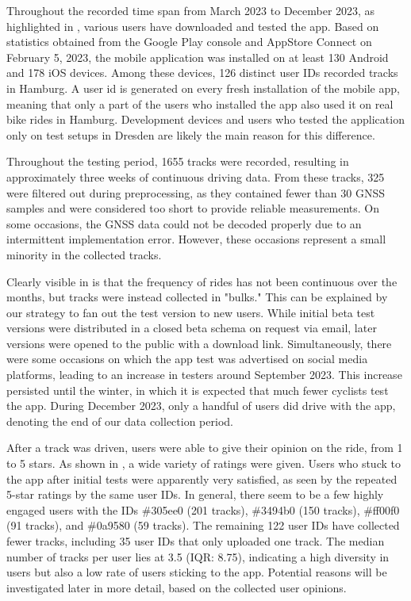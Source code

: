 Throughout the recorded time span from March 2023 to December 2023, as highlighted in , various users have downloaded and tested the app. Based on statistics obtained from the Google Play console and AppStore Connect on February 5, 2023, the mobile application was installed on at least 130 Android and 178 iOS devices. Among these devices, 126 distinct user IDs recorded tracks in Hamburg. A user id is generated on every fresh installation of the mobile app, meaning that only a part of the users who installed the app also used it on real bike rides in Hamburg. Development devices and users who tested the application only on test setups in Dresden are likely the main reason for this difference.

Throughout the testing period, 1655 tracks were recorded, resulting in approximately three weeks of continuous driving data. From these tracks, 325 were filtered out during preprocessing, as they contained fewer than 30 GNSS samples and were considered too short to provide reliable measurements. On some occasions, the GNSS data could not be decoded properly due to an intermittent implementation error. However, these occasions represent a small minority in the collected tracks.

Clearly visible in  is that the frequency of rides has not been continuous over the months, but tracks were instead collected in "bulks." This can be explained by our strategy to fan out the test version to new users. While initial beta test versions were distributed in a closed beta schema on request via email, later versions were opened to the public with a download link. Simultaneously, there were some occasions on which the app test was advertised on social media platforms, leading to an increase in testers around September 2023. This increase persisted until the winter, in which it is expected that much fewer cyclists test the app. During December 2023, only a handful of users did drive with the app, denoting the end of our data collection period. 

After a track was driven, users were able to give their opinion on the ride, from 1 to 5 stars. As shown in , a wide variety of ratings were given. Users who stuck to the app after initial tests were apparently very satisfied, as seen by the repeated 5-star ratings by the same user IDs. In general, there seem to be a few highly engaged users with the IDs \#305ee0 (201 tracks), \#3494b0 (150 tracks), \#ff00f0 (91 tracks), and \#0a9580 (59 tracks). The remaining 122 user IDs have collected fewer tracks, including 35 user IDs that only uploaded one track. The median number of tracks per user lies at 3.5 (IQR: 8.75), indicating a high diversity in users but also a low rate of users sticking to the app. Potential reasons will be investigated later in more detail, based on the collected user opinions.

